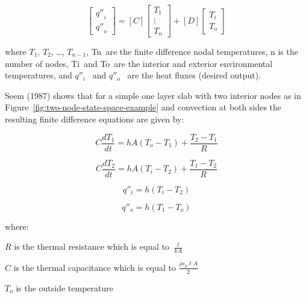 \begin{equation}
\left[ {\begin{array}{*{20}{c}}{{{q''}_i}}\\ {{{q''}_o}}\end{array}} \right] = \left[ C \right]\left[ {\begin{array}{*{20}{c}}{{T_1}}\\ \vdots \\ {{T_n}}\end{array}} \right] + \left[ D \right]\left[ {\begin{array}{*{20}{c}}{{T_i}}\\ {{T_o}}\end{array}} \right]
\end{equation}

where \(T_1\), \(T_2\), \ldots{}, \(T_{n-1}\), Tn~are the finite difference nodal temperatures, n is the number of nodes, Ti~and To~are the interior and exterior environmental temperatures, and \({q''_i}\) ~and \({q''_o}\) ~are the heat fluxes (desired output).

Seem (1987) shows that for a simple one layer slab with two interior nodes as in Figure~\ref{fig:two-node-state-space-example} and convection at both sides the resulting finite difference equations are given by:

\begin{equation}
C\frac{{d{T_1}}}{{dt}} = hA\left( {{T_o} - {T_1}} \right) + \frac{{{T_2} - {T_1}}}{R}
\end{equation}

\begin{equation}
C\frac{{d{T_2}}}{{dt}} = hA\left( {{T_i} - {T_2}} \right) + \frac{{{T_1} - {T_2}}}{R}
\end{equation}

\begin{equation}
{q''_i} = h\left( {{T_i} - {T_2}} \right)
\end{equation}

\begin{equation}
{q''_o} = h\left( {{T_1} - {T_o}} \right)
\end{equation}

where:

\(R\) is the thermal resistance which is equal to \(\frac{\ell }{{kA}}\)

\(C\) is the thermal capacitance which is equal to \(\frac{{\rho {c_p}\ell A}}{2}\)

\({T_o}\) is the outside temperature

